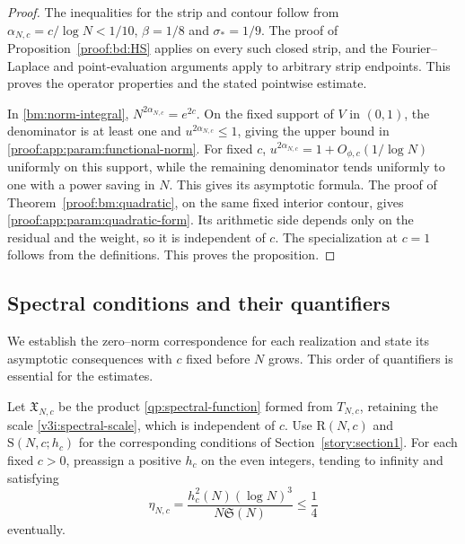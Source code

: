 \documentclass[12pt,a4paper]{amsart}
\numberwithin{equation}{section}
\def\le{\leqslant}
\theoremstyle{plain}
\theoremstyle{definition}
\theoremstyle{remark}
\begin{document}
\begin{proof}
The inequalities for the strip and contour follow from
$\alpha_{N,c}=c/\log N<1/10$, $\beta=1/8$ and $\sigma_*=1/9$.
The proof of Proposition~\ref{proof:bd:HS} applies on every such closed
strip, and the Fourier--Laplace and point-evaluation arguments
apply to arbitrary strip endpoints. This proves the operator
properties and the stated pointwise estimate.

In \eqref{bm:norm-integral}, $N^{2\alpha_{N,c}}=e^{2c}$.
On the fixed support of $V$ in $(0,1)$, the denominator is at
least one and $u^{2\alpha_{N,c}}\le1$, giving the upper bound
in \eqref{proof:app:param:functional-norm}. For fixed $c$,
$u^{2\alpha_{N,c}}=1+O_{\phi,c}(1/\log N)$ uniformly on this
support, while the remaining denominator tends uniformly to one
with a power saving in $N$. This gives its asymptotic formula.
The proof of Theorem~\ref{proof:bm:quadratic}, on the same fixed
interior contour, gives \eqref{proof:app:param:quadratic-form}.
Its arithmetic side depends only on the residual and the weight,
so it is independent of $c$. The specialization at $c=1$ follows
from the definitions.
This proves the proposition.
\end{proof}

\subsection{Spectral conditions and their quantifiers}
\label{proof:app:param:families}

We establish the zero--norm correspondence for each realization
and state its asymptotic consequences with $c$ fixed before $N$
grows. This order of quantifiers is essential for the estimates.

Let $\mathfrak X_{N,c}$ be the product
\eqref{qp:spectral-function} formed from $T_{N,c}$, retaining the
scale \eqref{v3i:spectral-scale}, which is independent of $c$.
Use $\mathrm R(N,c)$ and $\mathrm S(N,c;h_c)$ for the corresponding
conditions of Section~\ref{story:section1}.
For each fixed $c>0$, preassign a positive $h_c$ on the even
integers, tending to infinity and satisfying
\begin{equation}\label{proof:app:param:S-width}
 \eta_{N,c}=\frac{h_c^2(N)(\log N)^3}{N\mathfrak S(N)}\le\frac14
\end{equation}
eventually.
\end{document}
